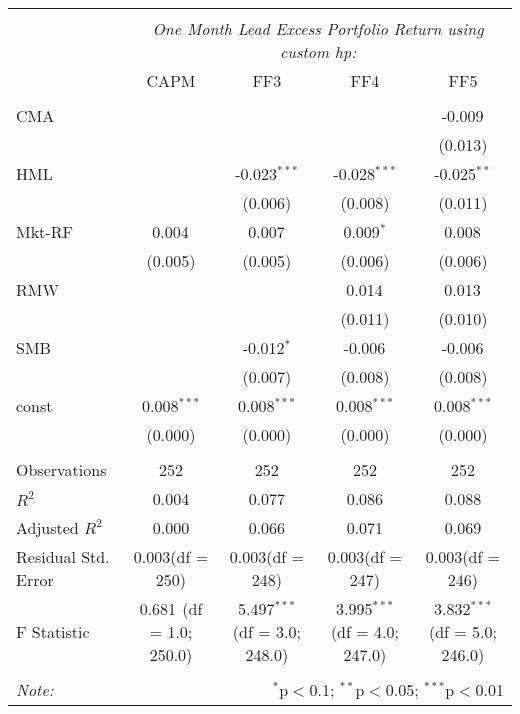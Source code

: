 \begin{table}[!htbp] \centering
\begin{tabular}{@{\extracolsep{5pt}}lcccc}
\\[-1.8ex]\hline
\hline \\[-1.8ex]
& \multicolumn{4}{c}{\textit{One Month Lead Excess Portfolio Return using custom hp:}} \
\cr \cline{4-5}
\\[-1.8ex] & CAPM & FF3 & FF4 & FF5 \\
\hline \\[-1.8ex]
 CMA & & & & -0.009$^{}$ \\
  & & & & (0.013) \\
 HML & & -0.023$^{***}$ & -0.028$^{***}$ & -0.025$^{**}$ \\
  & & (0.006) & (0.008) & (0.011) \\
 Mkt-RF & 0.004$^{}$ & 0.007$^{}$ & 0.009$^{*}$ & 0.008$^{}$ \\
  & (0.005) & (0.005) & (0.006) & (0.006) \\
 RMW & & & 0.014$^{}$ & 0.013$^{}$ \\
  & & & (0.011) & (0.010) \\
 SMB & & -0.012$^{*}$ & -0.006$^{}$ & -0.006$^{}$ \\
  & & (0.007) & (0.008) & (0.008) \\
 const & 0.008$^{***}$ & 0.008$^{***}$ & 0.008$^{***}$ & 0.008$^{***}$ \\
  & (0.000) & (0.000) & (0.000) & (0.000) \\
\hline \\[-1.8ex]
 Observations & 252 & 252 & 252 & 252 \\
 $R^2$ & 0.004 & 0.077 & 0.086 & 0.088 \\
 Adjusted $R^2$ & 0.000 & 0.066 & 0.071 & 0.069 \\
 Residual Std. Error & 0.003(df = 250) & 0.003(df = 248) & 0.003(df = 247) & 0.003(df = 246)  \\
 F Statistic & 0.681$^{}$ (df = 1.0; 250.0) & 5.497$^{***}$ (df = 3.0; 248.0) & 3.995$^{***}$ (df = 4.0; 247.0) & 3.832$^{***}$ (df = 5.0; 246.0) \\
\hline
\hline \\[-1.8ex]
\textit{Note:} & \multicolumn{4}{r}{$^{*}$p$<$0.1; $^{**}$p$<$0.05; $^{***}$p$<$0.01} \\
\end{tabular}
\end{table}

